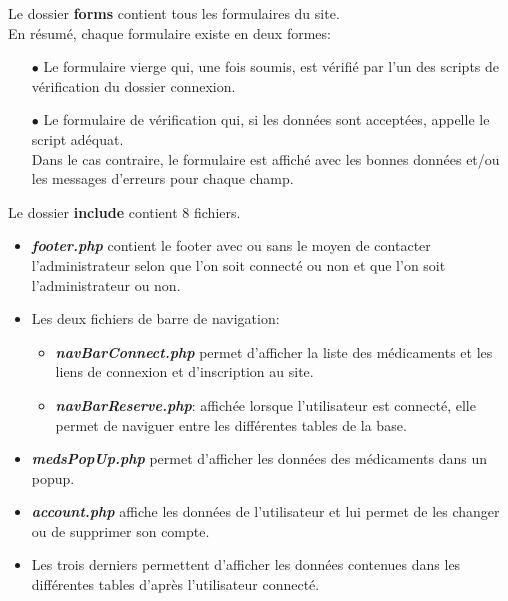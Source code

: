 \newpage

Le dossier \textbf{forms} contient tous les formulaires du site.\\

En résumé, chaque formulaire existe en deux formes:
\begin{itemize}
    
    \item[$\bullet$] Le formulaire vierge qui, une fois soumis, est vérifié par l’un des scripts de vérification du dossier connexion.
    
    \item[$\bullet$] Le formulaire de vérification qui, si les données sont acceptées, appelle le script adéquat.\\
    Dans le cas contraire, le formulaire est affiché avec les bonnes données et/ou les messages d’erreurs pour chaque champ.\\
    
\end{itemize}

Le dossier \textbf{include} contient 8 fichiers.

\begin{itemize}
    
    \item \textbf{\textit{footer.php}} contient le footer avec ou sans le moyen de contacter l’administrateur selon que l’on soit connecté ou non et que l’on soit l’administrateur ou non.
    
    \item Les deux fichiers de barre de navigation:
    \begin{itemize}
        
        \item \textbf{\textit{navBarConnect.php}} permet d’afficher la liste des médicaments et les liens de connexion et d’inscription au site.
        
        \item \textbf{\textit{navBarReserve.php}}: affichée lorsque l’utilisateur est connecté, elle permet de naviguer entre les différentes tables de la base.
        
    \end{itemize}
    
    \item \textbf{\textit{medsPopUp.php}} permet d’afficher les données des médicaments dans un popup.
    
    \item \textbf{\textit{account.php}} affiche les données de l’utilisateur et lui permet de les changer ou de supprimer son compte.
    
    \item Les trois derniers permettent d’afficher les données contenues dans les différentes tables d’après l’utilisateur connecté.
    
\end{itemize}

